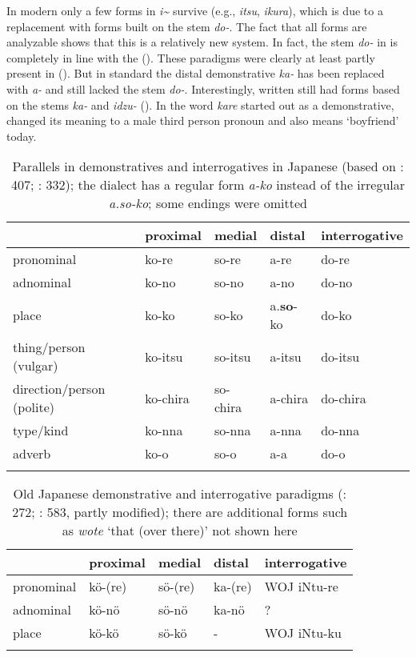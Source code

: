 In modern  only a few forms in \textit{i{\textasciitilde}} survive (e.g., \textit{itsu}, \textit{ikura}), which is due to a replacement with forms built on the stem \textit{do-}. The fact that all forms are analyzable shows that this is a relatively new system. In fact, the  stem \textit{do-} in  is completely in line with the  (). These paradigms were clearly at least partly present in  (). But in standard  the distal demonstrative \textit{ka-} has been replaced with \textit{a-} and  still lacked the stem \textit{do-}. Interestingly, written  still had forms based on the stems \textit{ka-} and \textit{idzu-} (). In  the word \textit{kare} started out as a demonstrative, changed its meaning to a male third person pronoun and also means ‘boyfriend’ today.

\begin{table}
\caption{Parallels in demonstratives and interrogatives in Japanese (based on \citealt{Dixon2012}: 407; \citealt{Hasegawa2015}: 332); the  dialect has a regular form \textit{a-ko} instead of the irregular \textit{a.so-ko}; some endings were omitted}
\label{tab:japa:8}

\begin{tabularx}{\textwidth}{lXXXl}
\lsptoprule
& \textbf{proximal} & \textbf{medial} & \textbf{distal} & \textbf{interrogative}\\
\midrule
pronominal & ko-re & so-re & a-re & do-re\\
adnominal & ko-no & so-no & a-no & do-no\\
place & ko-ko & so-ko & a.\textbf{so}-ko & do-ko\\
thing/person (vulgar) & ko-itsu & so-itsu & a-itsu & do-itsu\\
direction/person (polite) & ko-chira & so-chira & a-chira & do-chira\\
type/kind & ko-nna & so-nna & a-nna & do-nna\\
adverb & ko-o & so-o & a-a & do-o\\
\lspbottomrule
\end{tabularx}
\end{table}

\begin{table}
\caption{Old Japanese demonstrative and interrogative paradigms (\citealt{Vovin2005}: 272; \citealt{Kupchik2011}: 583, partly modified); there are additional forms such as \textit{wote} ‘that (over there)’ not shown here}
\label{tab:japa:9}
\begin{tabularx}{\textwidth}{XXXXl}
\lsptoprule
& \textbf{proximal} & \textbf{medial} & \textbf{distal} & \textbf{interrogative}\\
\midrule
pronominal & kö-(re) & sö-(re) & ka-(re) & WOJ iNtu-re\\
adnominal & kö-nö & sö-nö & ka-nö & ?\\
place & kö-kö & sö-kö & - & WOJ iNtu-ku\\
\lspbottomrule
\end{tabularx}
\end{table}

